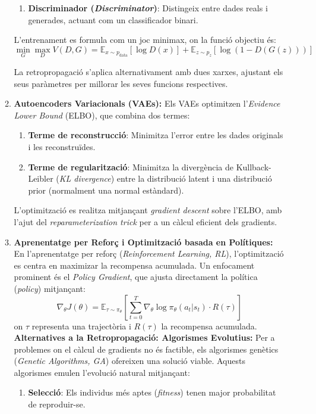 \begin{enumerate}
\begin{enumerate}
\begin{enumerate}
           \item \textbf{Discriminador (\textit{Discriminator})}: Distingeix entre dades reals i generades, actuant com un classificador binari.
          \end{enumerate}
           L'entrenament es formula com un joc minimax, on la funció objectiu és:
           $$ \min_G \max_D V(D, G) = \mathbb{E}_{x \sim p_{\text{data}}}[\log D(x)] + \mathbb{E}_{z \sim p_z}[\log(1 - D(G(z)))] $$

           La retropropagació s'aplica alternativament amb dues xarxes, ajustant els seus paràmetres per millorar les seves funcions respectives.


           \item \textbf{Autoencoders Variacionals (VAEs):} Els VAEs optimitzen l'\textit{Evidence Lower Bound} (ELBO), que combina dos termes:
               \begin{enumerate}
                \item \textbf{Terme de reconstrucció}: Minimitza l'error entre les dades originals i les reconstruïdes.

                \item \textbf{Terme de regularització}: Minimitza la divergència de Kullback-Leibler (\textit{KL divergence}) entre la distribució latent i una distribució prior (normalment una normal estàndard).


               \end{enumerate}
            L'optimització es realitza mitjançant \textit{gradient descent} sobre l'ELBO, amb l'ajut del \textit{reparameterization trick} per a un càlcul eficient dels gradients.

            \item \textbf{Aprenentatge per Reforç i Optimització basada en Polítiques:} En l'aprenentatge per reforç (\textit{Reinforcement Learning, RL}), l'optimització es centra en maximizar la recompensa acumulada. Un enfocament prominent és el \textit{Policy Gradient}, que ajusta directament la política (\textit{policy}) mitjançant:
           $$ \nabla_\theta J(\theta) = \mathbb{E}_{\tau \sim \pi_\theta} \left[ \sum_{t=0}^T \nabla_\theta \log \pi_\theta(a_t|s_t) \cdot R(\tau) \right] $$
           on $\tau$ representa una trajectòria i $R(\tau)$ la recompensa acumulada.\\
           \textbf{Alternatives a la Retropropagació: Algorismes Evolutius:} Per a problemes on el càlcul de gradients no és factible, els algorismes genètics (\textit{Genetic Algorithms, GA}) ofereixen una solució viable. Aquests algorismes emulen l'evolució natural mitjançant:
               \begin{enumerate}
                \item \textbf{Selecció}: Els individus més aptes (\textit{fitness}) tenen major probabilitat de reproduir-se.


\end{enumerate}
\end{enumerate}
\end{enumerate}
